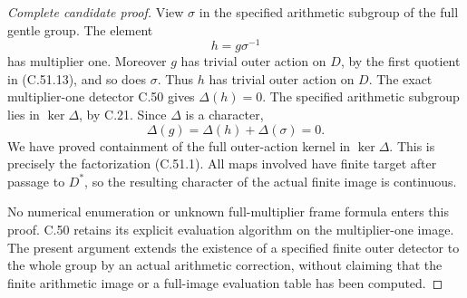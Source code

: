 \begin{proof}[Complete candidate proof]
View $\sigma$ in the specified arithmetic subgroup of the full
gentle group. The element
\[
                           h=g\sigma^{-1}
                                                        \tag{C.51.16}
\]
has multiplier one. Moreover $g$ has trivial outer action on
$D$, by the first quotient in (C.51.13), and so does $\sigma$.
Thus $h$ has trivial outer action on $D$.
The exact multiplier-one detector C.50 gives $\Delta(h)=0$.
The specified arithmetic subgroup lies in $\ker\Delta$, by
C.21. Since $\Delta$ is a character,
\[
                    \Delta(g)=\Delta(h)+\Delta(\sigma)=0.
                                                        \tag{C.51.17}
\]
We have proved containment of the full outer-action kernel in
$\ker\Delta$. This is precisely the factorization (C.51.1).
All maps involved have finite target after passage to $D^*$, so
the resulting character of the actual finite image is continuous.

No numerical enumeration or unknown full-multiplier frame formula
enters this proof. C.50 retains its explicit evaluation algorithm
on the multiplier-one image. The present argument extends the
existence of a specified finite outer detector to the whole group
by an actual arithmetic correction, without claiming that the
finite arithmetic image or a full-image evaluation table has been
computed.
\end{proof}
